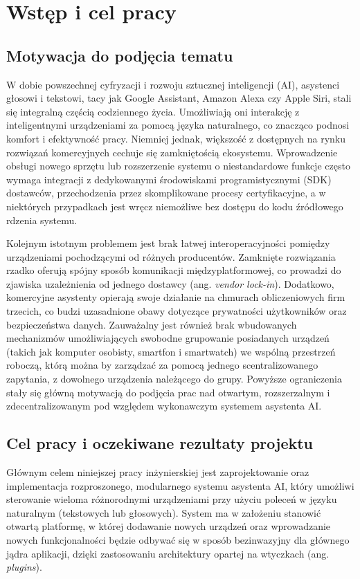 \chapter{Wstęp i cel pracy}
\label{cha:wstep}

\section{Motywacja do podjęcia tematu}
\label{sec:motywacja}
W dobie powszechnej cyfryzacji i rozwoju sztucznej inteligencji (AI), asystenci głosowi i tekstowi, tacy jak Google Assistant, Amazon Alexa czy Apple Siri, stali się integralną częścią codziennego życia. Umożliwiają oni interakcję z inteligentnymi urządzeniami za pomocą języka naturalnego, co znacząco podnosi komfort i efektywność pracy. Niemniej jednak, większość z dostępnych na rynku rozwiązań komercyjnych cechuje się zamkniętością ekosystemu. Wprowadzenie obsługi nowego sprzętu lub rozszerzenie systemu o niestandardowe funkcje często wymaga integracji z dedykowanymi środowiskami programistycznymi (SDK) dostawców, przechodzenia przez skomplikowane procesy certyfikacyjne, a w niektórych przypadkach jest wręcz niemożliwe bez dostępu do kodu źródłowego rdzenia systemu.

Kolejnym istotnym problemem jest brak łatwej interoperacyjności pomiędzy urządzeniami pochodzącymi od różnych producentów. Zamknięte rozwiązania rzadko oferują spójny sposób komunikacji międzyplatformowej, co prowadzi do zjawiska uzależnienia od jednego dostawcy (ang. \textit{vendor lock-in}). Dodatkowo, komercyjne asystenty opierają swoje działanie na chmurach obliczeniowych firm trzecich, co budzi uzasadnione obawy dotyczące prywatności użytkowników oraz bezpieczeństwa danych. Zauważalny jest również brak wbudowanych mechanizmów umożliwiających swobodne grupowanie posiadanych urządzeń (takich jak komputer osobisty, smartfon i smartwatch) we wspólną przestrzeń roboczą, którą można by zarządzać za pomocą jednego scentralizowanego zapytania, z dowolnego urządzenia należącego do grupy. Powyższe ograniczenia stały się główną motywacją do podjęcia prac nad otwartym, rozszerzalnym i zdecentralizowanym pod względem wykonawczym systemem asystenta AI.

\section{Cel pracy i oczekiwane rezultaty projektu}
\label{sec:cele}
Głównym celem niniejszej pracy inżynierskiej jest zaprojektowanie oraz implementacja rozproszonego, modularnego systemu asystenta AI, który umożliwi sterowanie wieloma różnorodnymi urządzeniami przy użyciu poleceń w języku naturalnym (tekstowych lub głosowych). System ma w założeniu stanowić otwartą platformę, w której dodawanie nowych urządzeń oraz wprowadzanie nowych funkcjonalności będzie odbywać się w sposób bezinwazyjny dla głównego jądra aplikacji, dzięki zastosowaniu architektury opartej na wtyczkach (ang. \textit{plugins}).

